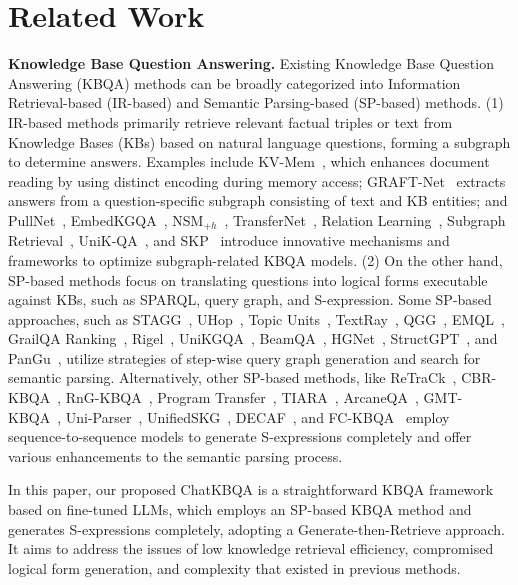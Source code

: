 \documentclass{article} \usepackage{iclr2024_conference,times}
\begin{document}
\section{Related Work}
\label{s2}
\textbf{Knowledge Base Question Answering.}
Existing Knowledge Base Question Answering (KBQA) methods can be broadly categorized into Information Retrieval-based (IR-based) and Semantic Parsing-based (SP-based) methods. (1) IR-based methods primarily retrieve relevant factual triples or text from Knowledge Bases (KBs) based on natural language questions, forming a subgraph to determine answers. Examples include KV-Mem~\citep{KV-Mem}, which enhances document reading by using distinct encoding during memory access; GRAFT-Net~\citep{GRAFT-Net} extracts answers from a question-specific subgraph consisting of text and KB entities; and PullNet~\citep{PullNet}, EmbedKGQA~\citep{EmbedKGQA}, NSM$_{+h}$~\citep{NSM}, TransferNet~\citep{TransferNet}, Relation Learning~\citep{RelationLearning}, Subgraph Retrieval~\citep{SubgraphRetrieval}, UniK-QA~\citep{UniK-QA}, and SKP~\citep{SKP} introduce innovative mechanisms and frameworks to optimize subgraph-related KBQA models. (2) On the other hand, SP-based methods focus on translating questions into logical forms executable against KBs, such as SPARQL, query graph, and S-expression. Some SP-based approaches, such as STAGG~\citep{STAGG}, UHop~\citep{UHop}, Topic Units~\citep{TopicUnits}, TextRay~\citep{TextRay}, QGG~\citep{QGG}, EMQL~\citep{EMQL}, GrailQA Ranking~\citep{GrailQA}, Rigel~\citep{Rigel}, UniKGQA~\citep{UniKGQA}, BeamQA~\citep{BeamQA}, HGNet~\citep{HGNet}, StructGPT~\citep{StructGPT}, and PanGu~\citep{PanGu}, utilize strategies of step-wise query graph generation and search for semantic parsing. Alternatively, other SP-based methods, like ReTraCk~\citep{ReTraCk}, CBR-KBQA~\citep{CBR-KBQA}, RnG-KBQA~\citep{RnG-KBQA}, Program Transfer~\citep{ProgramTransfer}, TIARA~\citep{TIARA}, ArcaneQA~\citep{ArcaneQA}, GMT-KBQA~\citep{GMT-KBQA}, Uni-Parser~\citep{Uni-Parser}, UnifiedSKG~\citep{UnifiedSKG}, DECAF~\citep{DECAF}, and FC-KBQA~\citep{FC-KBQA} employ sequence-to-sequence models to generate S-expressions completely and offer various enhancements to the semantic parsing process.

In this paper, our proposed ChatKBQA is a straightforward KBQA framework based on fine-tuned LLMs, which employs an SP-based KBQA method and generates S-expressions completely, adopting a Generate-then-Retrieve approach. It aims to address the issues of low knowledge retrieval efficiency, compromised logical form generation, and complexity that existed in previous methods.
\end{document}
